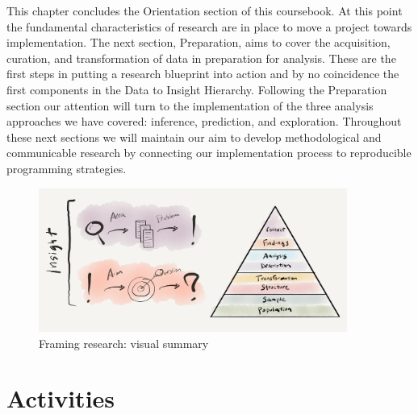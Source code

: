 \documentclass[
  letterpaper,
]{latex/krantz}
\begin{document}
This chapter concludes the Orientation section of this coursebook. At
this point the fundamental characteristics of research are in place to
move a project towards implementation. The next section, Preparation,
aims to cover the acquisition, curation, and transformation of data in
preparation for analysis. These are the first steps in putting a
research blueprint into action and by no coincidence the first
components in the Data to Insight Hierarchy. Following the Preparation
section our attention will turn to the implementation of the three
analysis approaches we have covered: inference, prediction, and
exploration. Throughout these next sections we will maintain our aim to
develop methodological and communicable research by connecting our
implementation process to reproducible programming strategies.

\begin{figure}[h]

{\centering \includegraphics[width=0.9\textwidth,height=\textheight]{./figures/framing-research/framing-research-visual-summary.png}

}

\caption{\label{fig-framing-research-visual-summary-graphic}Framing
research: visual summary}

\end{figure}

\hypertarget{activities-3}{%
\section*{Activities}\label{activities-3}}

\end{document}

